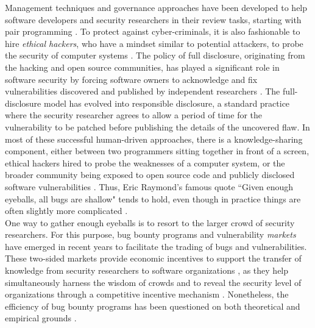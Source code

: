 Management techniques and governance approaches have been developed to help software developers and security researchers in their review tasks, starting with pair programming \cite{hulkko2005multiple}. To protect against cyber-criminals, it is also fashionable to hire {\it ethical hackers}, who have a mindset similar to potential attackers, to probe the security of computer systems \cite{smith2002ethical,saleem2006ethical,bishop2007penetration}. The policy of full disclosure, originating from the hacking and open source communities, has played a significant role in software security by forcing software owners to acknowledge and fix vulnerabilities discovered and published by independent researchers \cite{arora2008optimal}. The full-disclosure model has evolved into responsible disclosure, a standard practice where the security researcher agrees to allow a period of time for the vulnerability to be patched before publishing the details of the uncovered flaw. In most of these successful human-driven approaches, there is a knowledge-sharing component, either between two programmers sitting together in front of a screen, ethical hackers hired to probe the weaknesses of a computer system, or the broader community being exposed to open source code and publicly disclosed software vulnerabilities \cite{cavusoglu2007efficiency}. Thus, Eric Raymond's famous quote ``Given enough eyeballs, all bugs are shallow" \cite{raymond1999cathedral} tends to hold, even though in practice things are often slightly more complicated \cite{hafiz2015game}.\\

One way to gather enough eyeballs is to resort to the larger crowd of security researchers. For this purpose, bug bounty programs and vulnerability {\it markets} have emerged in recent years to facilitate the trading of bugs and vulnerabilities. These two-sided markets provide economic incentives to support the transfer of knowledge from security researchers to software organizations \cite{camp2004pricing}, as they help simultaneously harness the wisdom of crowds and to reveal the security level of organizations through a competitive incentive mechanism \cite{schechter2002buy}. Nonetheless, the efficiency of bug bounty programs has been questioned on both theoretical \cite{kannan2005market,mckinney2007vulnerability} and empirical grounds \cite{ransbotham2008markets,algarni2014software}.\\

